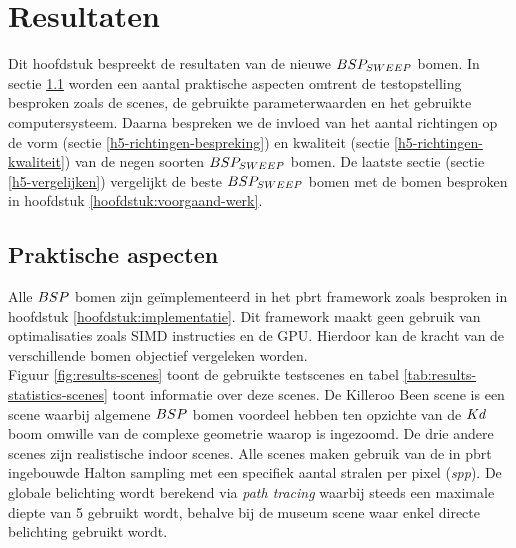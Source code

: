 \newcommand\skipCaption[1]{
  \vspace*{-6mm}
  \caption{#1}
}

\newcommand\skipCaptionA[2]{
  \vspace*{-#1mm}
  \caption{#2}
}

\chapter{Resultaten}
\label{hoofdstuk:resultaten}
Dit hoofdstuk bespreekt de resultaten van de nieuwe $BSP_{SWEEP}$ bomen.
In sectie \ref{h5:praktische-aspecten} worden een aantal praktische aspecten omtrent de testopstelling besproken zoals de scenes, de gebruikte parameterwaarden en het gebruikte computersysteem.
Daarna bespreken we de invloed van het aantal richtingen op de vorm (sectie \ref{h5-richtingen-bespreking}) en kwaliteit (sectie \ref{h5-richtingen-kwaliteit}) van de negen soorten $BSP_{SWEEP}$ bomen.
De laatste sectie (sectie \ref{h5-vergelijken}) vergelijkt de beste $BSP_{SWEEP}$ bomen met de bomen besproken in hoofdstuk \ref{hoofdstuk:voorgaand-werk}.

\section{Praktische aspecten}
\label{h5:praktische-aspecten}
Alle $BSP$ bomen zijn geïmplementeerd in het pbrt \cite{pbrt} framework zoals besproken in hoofdstuk \ref{hoofdstuk:implementatie}. 
Dit framework maakt geen gebruik van optimalisaties zoals SIMD instructies en de GPU. 
Hierdoor kan de kracht van de verschillende bomen objectief vergeleken worden.\\

Figuur \ref{fig:results-scenes} toont de gebruikte testscenes en tabel \ref{tab:results-statistics-scenes} toont informatie over deze scenes.
De Killeroo Been scene is een scene waarbij algemene $BSP$ bomen voordeel hebben ten opzichte van de $Kd$ boom omwille van de complexe geometrie waarop is ingezoomd.
De drie andere scenes zijn realistische indoor scenes.
Alle scenes maken gebruik van de in pbrt ingebouwde Halton sampling met een specifiek aantal stralen per pixel (\textit{spp}).
De globale belichting wordt berekend via \textit{path tracing} waarbij steeds een maximale diepte van 5 gebruikt wordt, behalve bij de museum scene waar enkel directe belichting gebruikt wordt.\\

